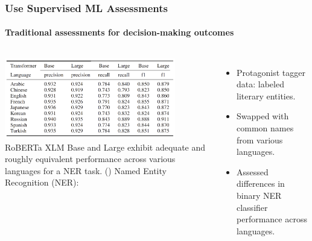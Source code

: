 \documentclass[11pt,
               aspectratio=169,
               hyperref={colorlinks}
               ]{beamer}
\begin{document}
		\begin{frame}
			
			\frametitle{Use Supervised ML Assessments}
			\framesubtitle{Traditional assessments for decision-making outcomes}
			
			\begin{columns}
				\centering
				\newline  \newline  \newline
				\includegraphics[height=100pt]{../img/Superv_ML.png} 
				\newline
				\tiny{RoBERTa XLM Base and Large exhibit adequate and roughly equivalent performance across various languages for a NER task. (\cite{iqtlabs})}
				\vspace{-5pt}
				Named Entity Recognition (NER):\\
				\begin{itemize}
					\item Protagonist tagger data: labeled literary entities.
					\item Swapped with common names from various languages.
					\item Assessed differences in binary NER classifier performance across languages.
				\end{itemize}
			\end{columns}
					
		\end{frame}



		
		
			
			
\end{document}
